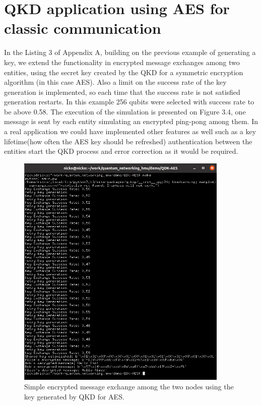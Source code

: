 \documentclass[12pt,a4paper] {report}
\begin{document}
		\section{QKD application using AES for classic communication}

		In the Listing 3 of Appendix A, building on the previous example of generating a key,
		we extend the functionality in encrypted message exchanges among two entities, using the secret key created
		by the QKD for a symmetric encryption algorithm (in this case AES). 
		Also a limit on the success rate of the key generation is implemented,
		so each time that the success rate is not satisfied
		generation restarts. In this example 256 qubits were selected with success rate to be above 0.58.
		The execution of the simulation is presented on Figure 3.4, one message is sent by each entity simulating
		an encrypted ping-pong among them. In a real application we could have implemented 
		other features as well such as a key lifetime(how often the AES key should be refreshed)
		authentication between the entities start the QKD process and error correction as it would be required.
		
		\begin{figure}[h!]
			\centering
			\includegraphics[width=0.9\textwidth]{qkd_aes/app.png}
			\caption{Simple encrypted message exchange among the two nodes using the key generated by QKD for AES.}
			\label{fig:}
		\end{figure}		
\end{document}
